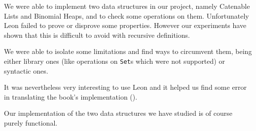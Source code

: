 We were able to implement two data structures in our project,
namely Catenable Lists and Binomial Heaps,
and to check some operations on them.
Unfortunately Leon failed to prove or disprove some properties. 
However our experiments have shown that this is difficult to avoid with recursive definitions.

We were able to isolate some limitations and find ways to circumvent them, 
being either library ones (like operations on \texttt{Set}s which were not supported) or syntactic ones.

It was nevertheless very interesting to use Leon and it helped us find some error 
in translating the book's implementation (\citep{Okasaki}). 

Our implementation of the two data structures we have studied is of course purely functional.